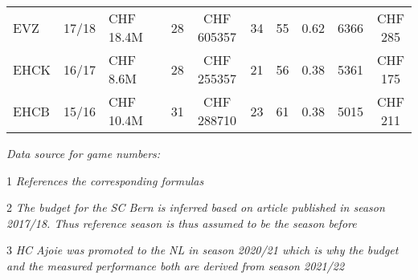 \begin{landscape}
\begin{table}[!ht]
\begin{threeparttable}
\begin{tabular}{lllcccccccc}
            EVZ & 17/18 & CHF 18.4M &  & 28 & CHF 605357 & 34 & 55 & 0.62 & 6366 & CHF 285 \\ 
            EHCK & 16/17 & CHF 8.6M &  & 28 & CHF 255357 & 21 & 56 & 0.38 & 5361 & CHF 175 \\ 
            EHCB & 15/16 & CHF 10.4M &  & 31 & CHF 288710 & 23 & 61 & 0.38 & 5015 & CHF 211 \\ 
            \bottomrule
        \end{tabular}
        \begin{tablenotes}[flushleft]
            \footnotesize
            \item \textit{Data source for game numbers: \cite{national_league_zuschauerzahlen_2022}}
            \item [1] \textit{References the corresponding formulas}
            \item [2] \textit{The budget for the SC Bern is inferred based on article published in season 2017/18. Thus reference season is thus assumed to be the season before}
            \item [3] \textit{HC Ajoie was promoted to the NL in season 2020/21 which is why the budget and the measured performance both are derived from season 2021/22}
        \end{tablenotes}
    \end{threeparttable}
\end{table}

\end{landscape}


